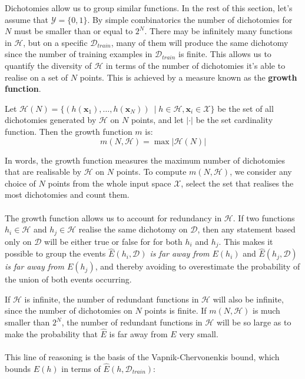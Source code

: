 Dichotomies allow us to group similar functions. In the rest of this section, let's assume that $\mathcal{Y} = \{0, 1\}$. By simple combinatorics the number of dichotomies for $N$ must be smaller than or equal to $2^N$. There may be infinitely many functions in $\mathcal{H}$, but on a specific $\mathcal{D}_{train}$, many of them will produce the same dichotomy since the number of training examples in $\mathcal{D}_{train}$ is finite.
This allows us to quantify the diversity of $\mathcal{H}$ in terms of the number of dichotomies it's able to realise on a set of $N$ points. This is achieved by a measure known as the \textbf{growth function}.
\begin{definition}
	\label{growth_function}
	Let $\mathcal{H}(N) = \{(h(\mathbf{x}_1), \dots, h(\mathbf{x}_N))\ \mid h \in \mathcal{H}, \mathbf{x}_i \in \mathcal{X}\}$ be the set of all dichotomies generated by $\mathcal{H}$ on $N$ points, and let $|\cdot|$ be the set cardinality function. Then the growth function $m$ is:
	$$
		m(N, \mathcal{H}) = \max |\mathcal{H}(N)|
	$$
\end{definition}
In words, the growth function measures the maximum number of dichotomies that are realisable by $\mathcal{H}$ on $N$ points. To compute $m(N, \mathcal{H})$, we consider any choice of $N$ points from the whole input space $\mathcal{X}$, select the set that realises the most dichotomies and count them.
\\\\
The growth function allows us to account for redundancy in $\mathcal{H}$. If two functions $h_i \in \mathcal{H}$ and $h_j \in \mathcal{H}$ realise the same dichotomy on $\mathcal{D}$, then any statement based only on $\mathcal{D}$ will be either true or false for for both $h_i$ and $h_j$. This makes it possible to group the events \textit{$\hat{E}(h_i, \mathcal{D})$ is far away from $E(h_i)$} and \textit{$\hat{E}(h_j, \mathcal{D})$ is far away from $E(h_j)$}, and thereby avoiding to overestimate the probability of the union of both events occurring.

If $\mathcal{H}$ is infinite, the number of redundant functions in $\mathcal{H}$ will also be infinite, since the number of dichotomies on $N$ points is finite. If $m(N, \mathcal{H})$ is much smaller than $2^N$, the number of redundant functions in $\mathcal{H}$ will be so large as to make the probability that $\hat{E}$ is far away from $E$ very small.
\\\\
 This line of reasoning is the basis of the Vapnik-Chervonenkis bound, which bounds $E(h)$ in terms of $\hat{E}(h, \mathcal{D}_{train})$:


